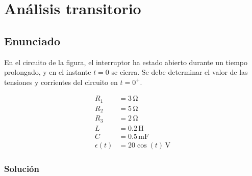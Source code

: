\chapter{Análisis transitorio}

\section{Enunciado}
En el circuito de la figura, el interruptor ha estado abierto durante un tiempo
prolongado, y en el instante $t = 0$ se cierra. Se debe determinar el valor de las tensiones y corrientes del circuito en $t = 0^+$.

\begin{minipage}{0.5\linewidth}
\end{minipage}
\begin{minipage}{0.5\linewidth}
  \begin{align*}
    R_1 &= 3\,\unit{\ohm}\\
    R_2 &= 5\,\unit{\ohm}\\
    R_3 &= 2\,\unit{\ohm}\\
    L &= 0.2\,\unit{\henry}\\
    C &= 0.5\,\unit{\milli\farad}\\
    \epsilon(t) &= 20\cos(t)\,\unit{\volt}
  \end{align*}
\end{minipage}

\subsection*{Solución}

